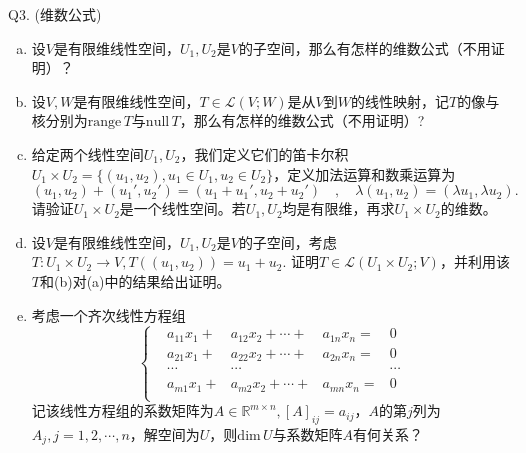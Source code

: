 \documentclass[a4[paper]{article}
\begin{document}
\noindent{} Q3. (维数公式)
\begin{enumerate}[(a).]
\item 设$V$是有限维线性空间，$U_1,U_2$是$V$的子空间，那么有怎样的维数公式（不用证明）？
\item 设$V,W$是有限维线性空间，$T\in\mathcal{L}(V;W)$是从$V$到$W$的线性映射，记$T$的像与核分别为$\mathrm{range}\,T$与$\mathrm{null}\,T$，那么有怎样的维数公式（不用证明）?
\item 给定两个线性空间$U_1,U_2$，我们定义它们的笛卡尔积$U_1\times U_2=\{(u_1,u_2),u_1\in U_1,u_2\in U_2\}$，定义加法运算和数乘运算为
\[(u_1,u_2)+(u_1',u_2')=(u_1+u_1',u_2+u_2')\quad,\quad \lambda(u_1,u_2)=(\lambda u_1,\lambda u_2).\]
请验证$U_1\times U_2$是一个线性空间。若$U_1,U_2$均是有限维，再求$U_1\times U_2$的维数。
\item 设$V$是有限维线性空间，$U_1,U_2$是$V$的子空间，考虑$T:U_1\times U_2\rightarrow V, T((u_1,u_2))=u_1+u_2$. 证明$T\in\mathcal{L}(U_1\times U_2;V)$，并利用该$T$和(b)对(a)中的结果给出证明。
\item 考虑一个齐次线性方程组
\[\left\{
\begin{aligned}
&a_{11}x_1 + &a_{12}x_2 +\cdots+&a_{1n}x_n =& 0\\
&a_{21}x_1 + &a_{22}x_2 +\cdots+&a_{2n}x_n = &0\\
&\cdots&\cdots&&\cdots\\
&a_{m1}x_1 + &a_{m2}x_2 +\cdots+&a_{mn}x_n = &0\\
\end{aligned}\right.
\]
记该线性方程组的系数矩阵为$A\in\mathbb{R}^{m\times n}, [A]_{ij}=a_{ij}$，$A$的第$j$列为$A_j,j=1,2,\cdots,n$，解空间为$U$，则$\mathrm{dim}\, U$与系数矩阵$A$有何关系？

\end{enumerate}
\end{document}
